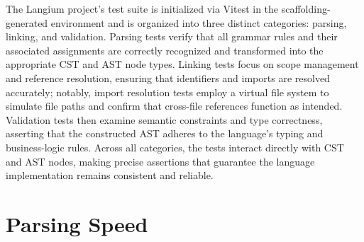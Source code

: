The Langium project's test suite is initialized via Vitest in the scaffolding-generated environment and is organized into three distinct categories: parsing, linking,
and validation. Parsing tests verify that all grammar rules and their associated assignments are correctly recognized and transformed into the appropriate CST and AST
node types. Linking tests focus on scope management and reference resolution, ensuring that identifiers and imports are resolved accurately; notably,
import resolution tests employ a virtual file system to simulate file paths and confirm that cross-file references function as intended. Validation tests then examine
semantic constraints and type correctness, asserting that the constructed AST adheres to the language's typing and business-logic rules. Across all categories,
the tests interact directly with CST and AST nodes, making precise assertions that guarantee the language implementation remains consistent and reliable.


\section{Parsing Speed}